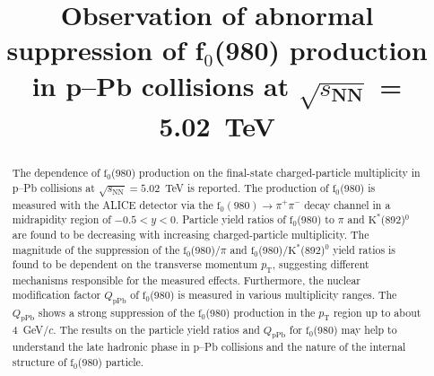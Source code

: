 \documentclass[ALICE,manyauthors]{cernphprep}
\begin{document}
\begin{titlepage}

\PHyear{}
\PHdate{\today}
%

\title{Observation of abnormal suppression of \textbf{f$_{0}$}(980) production \\in p--Pb collisions at $\sqrt{\textit{s}_{\mathbf{NN}}}$ = 5.02~TeV }

\ShortTitle{}   %


\begin{abstract}
The dependence of $\mathrm{f}_{0}$(980) production on the final-state charged-particle multiplicity in p--Pb collisions at $\sqrt{s_{\mathrm{NN}}} = 5.02$~TeV is reported. The production of $\mathrm{f}_{0}$(980) is measured with the ALICE detector via the $\mathrm{f}_0 (980) \rightarrow \pi^{+}\pi^{-}$ decay channel in a midrapidity region of $-0.5<y<0$. Particle yield ratios of $\mathrm{f}_{0}$(980) to $\pi$ and $\mathrm{K}^{*}$(892)$^{0}$ are found to be decreasing with increasing charged-particle multiplicity. The magnitude of the suppression of the $\mathrm{f}_{0}$(980)/$\pi$ and $\mathrm{f}_{0}$(980)/$\mathrm{K}^{*}$(892)$^{0}$ yield ratios is found to be dependent on the transverse momentum $p_{\mathrm{T}}$, suggesting different mechanisms responsible for the measured effects. Furthermore, the nuclear modification factor $Q_{\mbox{pPb}}$ of $\mathrm{f}_{0}$(980) is measured in various multiplicity ranges. The $Q_{\mbox{pPb}}$ shows a strong suppression of the $\mathrm{f}_{0}$(980) production in the $p_{\mathrm{T}}$ region up to about 4~GeV/$c$. The results on the particle yield ratios and $Q_{\mbox{pPb}}$ for $\mathrm{f}_{0}$(980) may help to understand the late hadronic phase in p--Pb collisions and the nature of the internal structure of $\mathrm{f}_{0}$(980) particle.

\color{black}

\end{abstract}
 
\end{titlepage}
\end{document}
